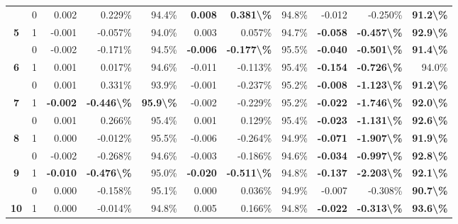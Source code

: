 \begin{table}
\begin{tabular}[t]{>{}ccrrrrrrrrr}
 & 0 & 0.002 & 0.229\% & 94.4\% & \textbf{ 0.008} & \textbf{ 0.381\textbackslash{}\%} & 94.8\% & -0.012 & -0.250\% & \textbf{91.2\textbackslash{}\%}\\

\multirow[t]{-2}{*}{\centering\arraybackslash \textbf{5}} & 1 & -0.001 & -0.057\% & 94.0\% & 0.003 & 0.057\% & 94.7\% & \textbf{-0.058} & \textbf{-0.457\textbackslash{}\%} & \textbf{92.9\textbackslash{}\%}\\

 & 0 & -0.002 & -0.171\% & 94.5\% & \textbf{-0.006} & \textbf{-0.177\textbackslash{}\%} & 95.5\% & \textbf{-0.040} & \textbf{-0.501\textbackslash{}\%} & \textbf{91.4\textbackslash{}\%}\\

\multirow[t]{-2}{*}{\centering\arraybackslash \textbf{6}} & 1 & 0.001 & 0.017\% & 94.6\% & -0.011 & -0.113\% & 95.4\% & \textbf{-0.154} & \textbf{-0.726\textbackslash{}\%} & 94.0\%\\

\rule{0pt}{4ex}
 & 0 & 0.001 & 0.331\% & 93.9\% & -0.001 & -0.237\% & 95.2\% & \textbf{-0.008} & \textbf{-1.123\textbackslash{}\%} & \textbf{91.2\textbackslash{}\%}\\

\multirow[t]{-2}{*}{\centering\arraybackslash \textbf{7}} & 1 & \textbf{-0.002} & \textbf{-0.446\textbackslash{}\%} & \textbf{95.9\textbackslash{}\%} & -0.002 & -0.229\% & 95.2\% & \textbf{-0.022} & \textbf{-1.746\textbackslash{}\%} & \textbf{92.0\textbackslash{}\%}\\

 & 0 & 0.001 & 0.266\% & 95.4\% & 0.001 & 0.129\% & 95.4\% & \textbf{-0.023} & \textbf{-1.131\textbackslash{}\%} & \textbf{92.6\textbackslash{}\%}\\

\multirow[t]{-2}{*}{\centering\arraybackslash \textbf{8}} & 1 & 0.000 & -0.012\% & 95.5\% & -0.006 & -0.264\% & 94.9\% & \textbf{-0.071} & \textbf{-1.907\textbackslash{}\%} & \textbf{91.9\textbackslash{}\%}\\

 & 0 & -0.002 & -0.268\% & 94.6\% & -0.003 & -0.186\% & 94.6\% & \textbf{-0.034} & \textbf{-0.997\textbackslash{}\%} & \textbf{92.8\textbackslash{}\%}\\

\multirow[t]{-2}{*}{\centering\arraybackslash \textbf{9}} & 1 & \textbf{-0.010} & \textbf{-0.476\textbackslash{}\%} & 95.0\% & \textbf{-0.020} & \textbf{-0.511\textbackslash{}\%} & 94.8\% & \textbf{-0.137} & \textbf{-2.203\textbackslash{}\%} & \textbf{92.1\textbackslash{}\%}\\

\rule{0pt}{4ex}
 & 0 & 0.000 & -0.158\% & 95.1\% & 0.000 & 0.036\% & 94.9\% & -0.007 & -0.308\% & \textbf{90.7\textbackslash{}\%}\\

\multirow[t]{-2}{*}{\centering\arraybackslash \textbf{10}} & 1 & 0.000 & -0.014\% & 94.8\% & 0.005 & 0.166\% & 94.8\% & \textbf{-0.022} & \textbf{-0.313\textbackslash{}\%} & \textbf{93.6\textbackslash{}\%}\\
\bottomrule
\end{tabular}
\end{table}
